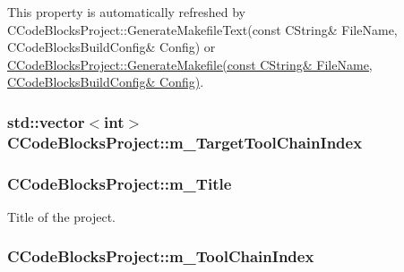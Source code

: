 This property is automatically refreshed by C\-Code\-Blocks\-Project\-::\-Generate\-Makefile\-Text(const C\-String\& File\-Name, C\-Code\-Blocks\-Build\-Config\& Config) or \hyperlink{classCCodeBlocksProject_aa2b01dbf48f2a193a0bc426bc50ce77b}{C\-Code\-Blocks\-Project\-::\-Generate\-Makefile(const C\-String\& File\-Name, C\-Code\-Blocks\-Build\-Config\& Config)}. \hypertarget{classCCodeBlocksProject_a40ff4f9f33157540d3e46e25e8cd278f}{
\subsubsection[{m\-\_\-\-Target\-Tool\-Chain\-Index}]{\setlength{\rightskip}{0pt plus 5cm}std\-::vector$<$int$>$ C\-Code\-Blocks\-Project\-::m\-\_\-\-Target\-Tool\-Chain\-Index\hspace{0.3cm}{\ttfamily [private]}}}\label{classCCodeBlocksProject_a40ff4f9f33157540d3e46e25e8cd278f}
\hypertarget{classCCodeBlocksProject_ae0e87353b071ae8106b039e580e74db4}{
\subsubsection[{m\-\_\-\-Title}]{\setlength{\rightskip}{0pt plus 5cm}C\-Code\-Blocks\-Project\-::m\-\_\-\-Title\hspace{0.3cm}{\ttfamily [private]}}}\label{classCCodeBlocksProject_ae0e87353b071ae8106b039e580e74db4}


Title of the project. 

\hypertarget{classCCodeBlocksProject_a90848c1fb72d0e0f15ec3e402f7d64ff}{
\subsubsection[{m\-\_\-\-Tool\-Chain\-Index}]{\setlength{\rightskip}{0pt plus 5cm}C\-Code\-Blocks\-Project\-::m\-\_\-\-Tool\-Chain\-Index\hspace{0.3cm}{\ttfamily [private]}}}\label{classCCodeBlocksProject_a90848c1fb72d0e0f15ec3e402f7d64ff}


